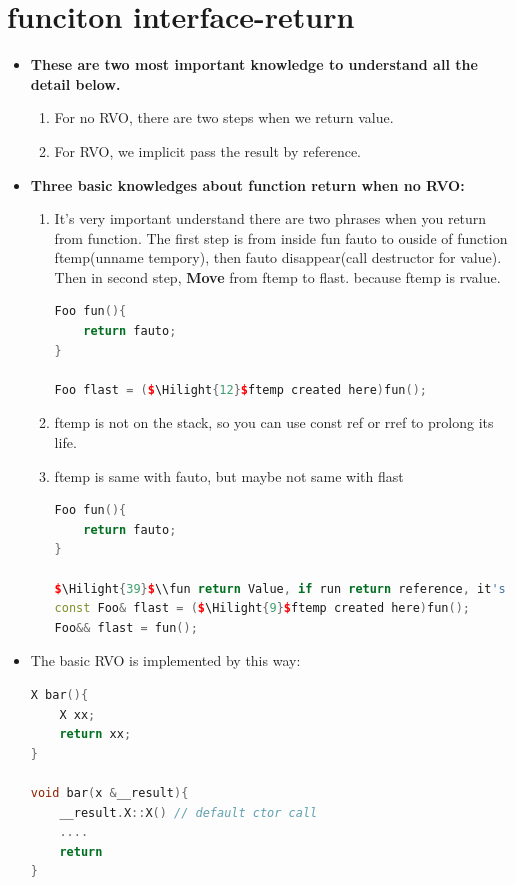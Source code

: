 \documentclass[a4paper,11pt,twoside]{book}
\newcommand{\Hilight}[1]{\makebox[0pt][l]{\color{yellow}\rule[-3pt]{#1em}{11pt}}}
\newcommand{\Hilight}[1]{}
\begin{document}
\section{funciton interface-return}
\begin{itemize}
	\item \textbf{These are two most important knowledge to understand all the detail below.}
	\begin{enumerate}
		\item For no RVO, there are two steps when we return value.
		\item For RVO, we implicit pass the result by reference.
	\end{enumerate}
	
	\item \textbf{Three basic knowledges about function return when no RVO:}
	\begin{enumerate}
		\item It's very important understand there are two phrases when you return from function. The first step  is from inside fun fauto to ouside of function ftemp(unname tempory), then fauto disappear(call destructor for value).  Then in second step, \textbf{Move} from ftemp to flast. because ftemp is rvalue.
\begin{lstlisting}[frame=single, language=c++]
Foo fun(){
	return fauto;
}
		
Foo flast = ($\Hilight{12}$ftemp created here)fun();
\end{lstlisting}
		\item ftemp is not on the stack, so you can use const ref or rref to prolong its life.
		
		\item ftemp is same with fauto, but maybe not same with flast
\begin{lstlisting}[frame=single, language=c++]
Foo fun(){
	return fauto;
}
		
$\Hilight{39}$\\fun return Value, if run return reference, it's dangerous.
const Foo& flast = ($\Hilight{9}$ftemp created here)fun();
Foo&& flast = fun();
\end{lstlisting}
	\end{enumerate}
	
	\item The basic RVO is implemented by this way:
\begin{lstlisting}[frame=single, language=c++]
X bar(){
	X xx;
	return xx;
}
	
void bar(x &__result){
	__result.X::X() // default ctor call
	....
	return
}
\end{lstlisting}
	
\end{itemize}
\end{document}
